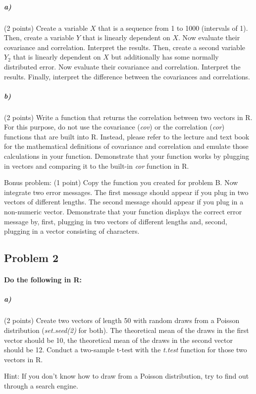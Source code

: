 \documentclass[12pt,letter]{article}
\begin{document}
\subparagraph{a)} (2 points) Create a variable $X$ that is a sequence from 1 to 1000 (intervals of 1). Then, create a variable $Y$ that is linearly dependent on $X$. Now evaluate their covariance and correlation. Interpret the results. Then, create a second variable $Y_2$ that is linearly dependent on $X$ but additionally has some normally distributed error. Now evaluate their covariance and correlation. Interpret the results. Finally, interpret the difference between the covariances and correlations.

\subparagraph{b)} (2 points) Write a function that returns the correlation between two vectors in R. For this purpose, do not use the covariance (\textit{cov}) or the correlation (\textit{cor}) functions that are built into R. Instead, please refer to the lecture and text book for the mathematical definitions of covariance and correlation and emulate those calculations in your function. Demonstrate that your function works by plugging in vectors and comparing it to the built-in \textit{cor} function in R.

\bigskip

Bonus problem: (1 point) Copy the function you created for problem B. Now integrate two error messages. The first message should appear if you plug in two vectors of different lengths. The second message should appear if you plug in a non-numeric vector. Demonstrate that your function displays the correct error message by, first, plugging in two vectors of different lengths and, second, plugging in a vector consisting of characters.



\subsection*{Problem 2}

\paragraph{Do the following in R:}

\subparagraph{a)} (2 points) Create two vectors of length 50 with random draws from a Poisson distribution (\textit{set.seed(2)} for both). The theoretical mean of the draws in the first vector should be 10, the theoretical mean of the draws in the second vector should be 12. Conduct a two-sample t-test with the \textit{t.test} function for those two vectors in R.

Hint: If you don't know how to draw from a Poisson distribution, try to find out through a search engine.
\end{document}

